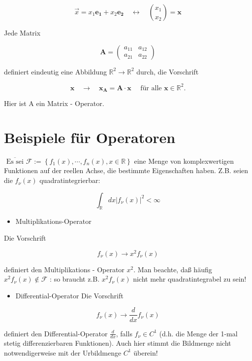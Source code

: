 \documentclass[10pt, letterpaper]{article}
\begin{document}
$$
\vec{x}=x_{1} \mathbf{e}_{\mathbf{1}}+x_{2} \mathbf{e}_{\mathbf{2}} \quad \leftrightarrow \quad\binom{x_{1}}{x_{2}}=\mathbf{x}
$$

Jede Matrix

$$
\mathbf{A}=\left(\begin{array}{ll}
a_{11} & a_{12} \\
a_{21} & a_{22}
\end{array}\right)
$$

definiert eindeutig eine Abbildung $\mathbb{R}^{2} \rightarrow \mathbb{R}^{2}$ durch, die Vorschrift

$$
\mathbf{x} \quad \rightarrow \quad \mathbf{x}_{\mathbf{A}}=\mathbf{A} \cdot \mathbf{x} \quad \text { für alle } \mathbf{x} \in \mathbb{R}^{2} .
$$

Hier ist A ein Matrix - Operator.

\section*{Beispiele für Operatoren}
$\overline{\text { Es sei }} \mathcal{F}:=\left\{f_{1}(x), \cdots, f_{n}(x), x \in \mathbb{R}\right\}$ eine Menge von komplexwertigen Funktionen auf der reellen Achse, die bestimmte Eigenschaften haben. Z.B. seien die $f_{\nu}(x)$ quadratintegrierbar:

$$
\int_{\mathbb{R}} d x\left|f_{\nu}(x)\right|^{2}<\infty
$$

\begin{itemize}
  \item Multiplikations-Operator
\end{itemize}

Die Vorschrift

$$
f_{\nu}(x) \rightarrow x^{2} f_{\nu}(x)
$$

definiert den Multiplikations - Operator $x^{2}$. Man beachte, daß häufig $x^{2} f_{\nu}(x) \notin \mathcal{F}$ : so braucht z.B. $x^{2} f_{\nu}(x)$ nicht mehr quadratintegrabel zu sein!

\begin{itemize}
  \item Differential-Operator Die Vorschrift
\end{itemize}

$$
f_{\nu}(x) \rightarrow \frac{d}{d x} f_{\nu}(x)
$$

definiert den Differential-Operator $\frac{d}{d x}$, falls $f_{\nu} \in C^{1}$ (d.h. die Menge der 1-mal stetig differenzierbaren Funktionen). Auch hier stimmt die Bildmenge nicht notwendigerweise mit der Urbildmenge $C^{1}$ überein!
\end{document}
